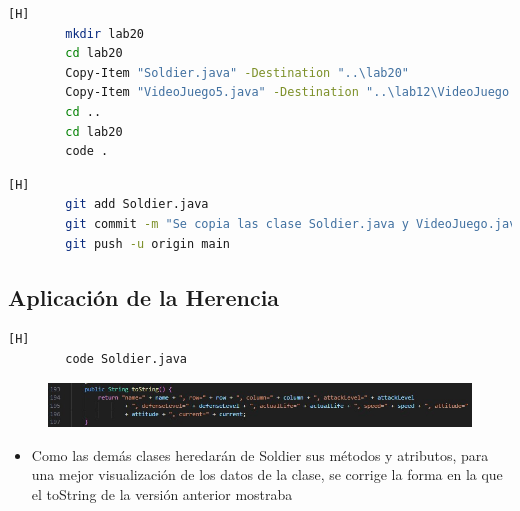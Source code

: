 \documentclass{article}
\begin{document}
	\begin{lstlisting}[language=bash,caption={Se crea la carpeta de laboratorio 20 y se copian los archivos del lab012 al lab20 }][H]
		mkdir lab20
		cd lab20
		Copy-Item "Soldier.java" -Destination "..\lab20"
		Copy-Item "VideoJuego5.java" -Destination "..\lab12\VideoJuego.java"
		cd ..
		cd lab20
		code .
	\end{lstlisting}
	
	\begin{lstlisting}[language=bash,caption={Commit: 99f16a3c517c18d8206b100d33722e5805398f60 }][H]
		git add Soldier.java
		git commit -m "Se copia las clase Soldier.java y VideoJuego.java del lab12 al 20"
		git push -u origin main
	\end{lstlisting}
	

	
	\subsection{Aplicación de la Herencia}
	\begin{lstlisting}[language=bash,caption={Se modifican metodos de la clase Soldier }][H]
		code Soldier.java
	\end{lstlisting}
	\begin{figure}[H]
		\centering
		\includegraphics[width=1\textwidth,keepaspectratio]{img/toString.jpg}
	\end{figure}
	
	\begin{itemize}	
		\item Como las demás clases heredarán de Soldier sus métodos y atributos, para una mejor visualización de los datos de la clase, se corrige la forma en la que el toString de la versión anterior mostraba   
	\end{itemize}
	
	
	
\end{document}
